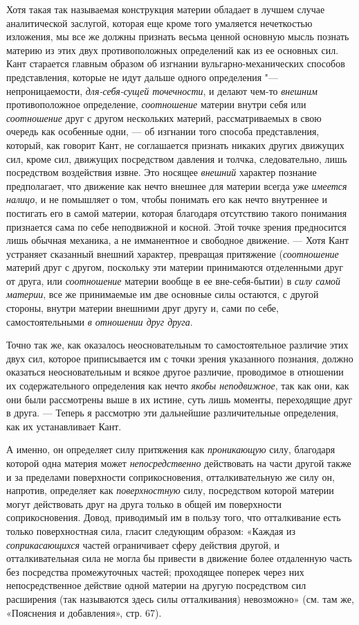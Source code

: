 Хотя такая так называемая конструкция материи обладает в лучшем случае
аналитической заслугой, которая еще кроме того умаляется нечеткостью
изложения, мы все же должны признать весьма ценной основную мысль познать
материю из этих двух противоположных определений как из ее основных сил.
Кант старается главным образом об изгнании вульгарно-механических способов
представления, которые не идут дальше одного определения "--- непроницаемости,
{\em для-себя-сущей точечности}, и делают чем-то
{\em внешним} противоположное определение,
{\em соотношение} материи внутри себя или
{\em соотношение} друг с другом нескольких материй,
рассматриваемых в свою очередь как особенные одни, — об изгнании того
способа представления, который, как говорит Кант, не соглашается признать
никаких других движущих сил, кроме сил, движущих посредством давления и
толчка, следовательно, лишь посредством воздействия извне. Это носящее
{\em внешний} характер познание предполагает, что
движение как нечто внешнее для материи всегда уже
{\em имеется налицо}, и не помышляет о том, чтобы
понимать его как нечто внутреннее и постигать его в самой материи, которая
благодаря отсутствию такого понимания признается сама по себе неподвижной и
косной. Этой точке зрения предносится лишь обычная механика, а не
имманентное и свободное движение. — Хотя Кант устраняет сказанный внешний
характер, превращая притяжение ({\em соотношение}
материй друг с другом, поскольку эти материи принимаются отделенными друг
от друга, или {\em соотношение} материи вообще в ее
вне-себя-бытии) в {\em силу самой материи}, все же
принимаемые им две основные силы остаются, с другой стороны, внутри материи
внешними друг другу и, сами по себе, самостоятельными
{\em в отношении друг друга}.

Точно так же, как оказалось неосновательным то самостоятельное различие этих
двух сил, которое приписывается им с точки зрения указанного познания,
должно оказаться неосновательным и всякое другое различие, проводимое в
отношении их содержательного определения как нечто
{\em якобы неподвижное}, так как они, как они были
рассмотрены выше в их истине, суть лишь моменты, переходящие друг в друга.
— Теперь я рассмотрю эти дальнейшие различительные определения, как их
устанавливает Кант.

А именно, он определяет силу притяжения как
{\em проникающую} силу, благодаря которой одна материя
может {\em непосредственно} действовать на части другой
также и за пределами поверхности соприкосновения, отталкивательную же силу
он, напротив, определяет как {\em поверхностную} силу,
посредством которой материи могут действовать друг на друга только в общей
им поверхности соприкосновения. Довод, приводимый им в пользу того, что
отталкивание есть только поверхностная сила, гласит следующим образом:
«Каждая из {\em соприкасающихся} частей ограничивает
сферу действия другой, и отталкивательная сила не могла бы привести в
движение более отдаленную часть без посредства промежуточных частей;
проходящее поперек через них непосредственное действие одной материи на
другую посредством сил расширения (так называются здесь силы отталкивания)
невозможно» (см. там же, «Пояснения и добавления», стр. 67).

